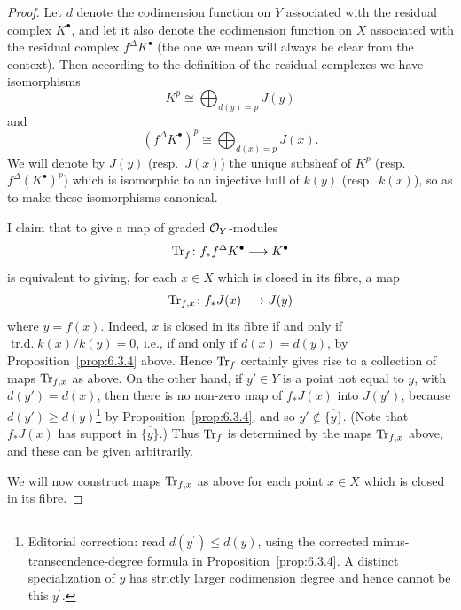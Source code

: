 \begin{proof}
\begingroup
\setlength{\emergencystretch}{2em}
Let $d$ denote the codimension function on $Y$ associated with the residual complex $K^{\bullet}$, and let it also denote the codimension function on $X$ associated with the residual complex $f^{\Delta}K^{\bullet}$ (the one we mean will always be clear from the context). Then according to the definition of the residual complexes we have isomorphisms
\[
K^{p} \cong \bigoplus_{d(y)=p} J(y)
\]
and
\[
(f^{\Delta}K^{\bullet})^{p} \cong \bigoplus_{d(x)=p} J(x).
\]
We will denote by $J(y)$ (resp.\ $J(x)$) the unique subsheaf of $K^{p}$ (resp.\ $f^{\Delta}(K^{\bullet})^{p}$) which is isomorphic to an injective hull of $k(y)$ (resp.\ $k(x)$), so as to make these isomorphisms canonical.

I claim that to give a map of graded $\mathcal{O}_Y$-modules
\[
\operatorname{Tr}_f\colon f_*f^{\Delta}K^{\bullet} \longrightarrow K^{\bullet}
\]
is equivalent to giving, for each $x\in X$ which is closed in its fibre, a map
\[
\operatorname{Tr}_{f,x}\colon f_{*}J(x) \longrightarrow J(y)
\]
where $y=f(x)$. Indeed, $x$ is closed in its fibre if and only if $\operatorname{tr.d.} k(x)/k(y)=0$, i.e., if and only if $d(x)=d(y)$, by Proposition~\ref{prop:6.3.4} above. Hence $\operatorname{Tr}_f$ certainly gives rise to a collection of maps $\operatorname{Tr}_{f,x}$ as above. On the other hand, if $y'\in Y$ is a point not equal to $y$, with $d(y')=d(x)$, then there is no non-zero map of $f_*J(x)$ into $J(y')$, because $d(y')\geq d(y)$\footnote{Editorial correction: read $d(y^{\prime})\leq d(y)$, using the corrected minus-transcendence-degree formula in Proposition~\ref{prop:6.3.4}. A distinct specialization of $y$ has strictly larger codimension degree and hence cannot be this $y^{\prime}$.} by Proposition~\ref{prop:6.3.4}, and so $y'\notin\overline{\{y\}}$. (Note that $f_*J(x)$ has support in $\overline{\{y\}}$.) Thus $\operatorname{Tr}_f$ is determined by the maps $\operatorname{Tr}_{f,x}$ above, and these can be given arbitrarily.

We will now construct maps $\operatorname{Tr}_{f,x}$ as above for each point $x\in X$ which is closed in its fibre.


\end{proof}

